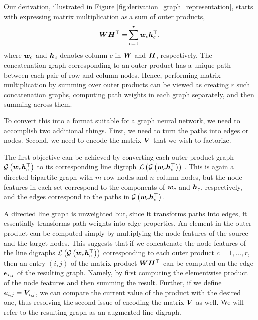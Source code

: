 \documentclass{article}
\begin{document}
Our derivation, illustrated in Figure \ref{fig:derivation_graph_representation}, starts with expressing matrix multiplication as a sum of outer products,
\begin{equation}
    {\bm{W}}{\bm{H}}^\top = \sum_{c=1}^r {\bm{w}}_c {\bm{h}}_c^\top  ,
\end{equation}
where ${\bm{w}}_c$ and ${\bm{h}}_c$ denotes column $c$ in ${\bm{W}}$ and ${\bm{H}}$, respectively. %
The concatenation graph corresponding to an outer product has a unique path between each pair of row and column nodes. Hence, performing matrix multiplication by summing over outer products can be viewed as creating $r$ such concatenation graphs, computing path weights in each graph separately, and then summing across them.

To convert this into a format suitable for a graph neural network, we need to accomplish two additional things. First, we need to turn the paths into edges or nodes. Second, we need to encode the matrix ${\bm{V}}$ that we wish to factorize.

The first objective can be achieved by converting each outer product graph ${\mathcal{G}}\left({\bm{w}}_c{\bm{h}}_c^\top  \right)$ to its corresponding line digraph ${\mathcal{L}}\left({\mathcal{G}}\left({\bm{w}}_c{\bm{h}}_c^\top  \right)\right)$ \citep{Harary1960}. This is again a directed bipartite graph with $m$ row nodes and $n$ column nodes, but the node features in each set correspond to the components of ${\bm{w}}_c$ and ${\bm{h}}_c$, respectively, and the edges correspond to the paths in ${\mathcal{G}}\left({\bm{w}}_c{\bm{h}}_c^\top  \right)$. 

A directed line graph is unweighted but, since it transforms paths into edges, it essentially transforms path weights into edge properties. An element in the outer product can be computed simply by multiplying the node features of the source and the target nodes. This suggests that if we concatenate the node features of the line digraphs ${\mathcal{L}}\left({\mathcal{G}}\left({\bm{w}}_c{\bm{h}}_c^\top  \right)\right)$ corresponding to each outer product $c=1,\ldots, r$, then an entry $(i,j)$ of the matrix product ${\bm{W}}{\bm{H}}^\top  $ can be computed on the edge ${\bm{e}}_{i,j}$ of the resulting graph. Namely, by first computing the elementwise product of the node features and then summing the result. Further, if we define ${\bm{e}}_{i,j}={\bm{V}}_{i,j}$, we can compare the current value of the product with the desired one, thus resolving the second issue of encoding the matrix ${\bm{V}}$ as well. We will refer to the resulting graph as an augmented line digraph.
\end{document}

